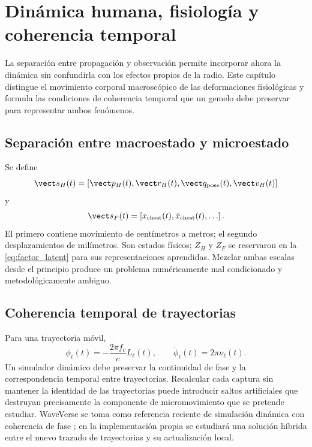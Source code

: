 \chapter{Dinámica humana, fisiología y coherencia temporal}
\label{ch:human_dynamics}

La separación entre propagación y observación permite incorporar ahora la dinámica sin
confundirla con los efectos propios de la radio. Este capítulo distingue el movimiento
corporal macroscópico de las deformaciones fisiológicas y formula las condiciones de
coherencia temporal que un gemelo debe preservar para representar ambos fenómenos.

\section{Separación entre macroestado y microestado}

Se define
\begin{equation}
\vect s_H(t)=\left[\vect p_H(t),\vect r_H(t),\vect q_{\rm pose}(t),\vect v_H(t)\right]
\end{equation}
y
\begin{equation}
\vect s_F(t)=\left[x_{\rm chest}(t),\dot x_{\rm chest}(t),\ldots\right].
\end{equation}
El primero contiene movimiento de centímetros a metros; el segundo desplazamientos de milímetros. Son estados físicos; $Z_H$ y $Z_F$ se reservaron en la \cref{eq:factor_latent} para sus representaciones aprendidas. Mezclar ambas escalas desde el principio produce un problema numéricamente mal condicionado y metodológicamente ambiguo.

\section{Coherencia temporal de trayectorias}

Para una trayectoria móvil,
\begin{equation}
\phi_\ell(t)=-\frac{2\pi f_c}{c}L_\ell(t),
\qquad
\dot\phi_\ell(t)=2\pi\nu_\ell(t).
\end{equation}
Un simulador dinámico debe preservar la continuidad de fase y la correspondencia temporal entre trayectorias. Recalcular cada captura sin mantener la identidad de las trayectorias puede introducir saltos artificiales que destruyan precisamente la componente de micromovimiento que se pretende estudiar. WaveVerse se toma como referencia reciente de simulación dinámica con coherencia de fase \citep{Zheng2026WaveVerse}; en la implementación propia se estudiará una solución híbrida entre el nuevo trazado de trayectorias y su actualización local.

